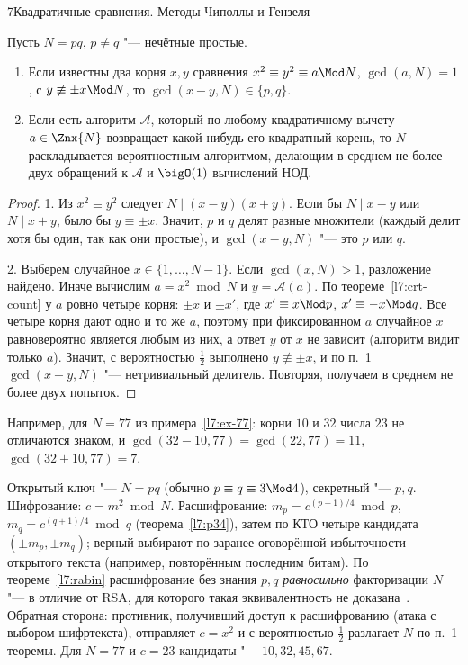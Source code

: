 \begin{lecture}{7}{Квадратичные сравнения. Методы Чиполлы и Гензеля}
\begin{theorem}[Рабин]\label{l7:rabin}
Пусть $N = pq$, $p \ne q$ "--- нечётные простые.
\begin{enumerate}
  \item Если известны два корня $x, y$ сравнения $x^2 \equiv y^2 \equiv a \Mod N$, $\gcd(a, N) = 1$,
    с $y \not\equiv \pm x \Mod N$, то $\gcd(x - y, N) \in \{p, q\}$.
  \item Если есть алгоритм $\mathcal{A}$, который по любому квадратичному вычету
    $a \in \Znx{N}$ возвращает какой-нибудь его квадратный корень, то $N$ раскладывается
    вероятностным алгоритмом, делающим в среднем не более двух обращений к $\mathcal{A}$ и
    $\bigO(1)$ вычислений НОД.
\end{enumerate}
\end{theorem}

\begin{proof}
1. Из $x^2 \equiv y^2$ следует $N \mid (x - y)(x + y)$. Если бы $N \mid x - y$ или $N \mid x + y$,
было бы $y \equiv \pm x$. Значит, $p$ и $q$ делят разные множители (каждый делит хотя бы один, так как они простые), и
$\gcd(x - y, N)$ "--- это $p$ или $q$.

2. Выберем случайное $x \in \{1, \dots, N - 1\}$. Если $\gcd(x, N) > 1$, разложение найдено.
Иначе вычислим $a = x^2 \bmod N$ и $y = \mathcal{A}(a)$. По теореме~\ref{l7:crt-count} у $a$ ровно
четыре корня: $\pm x$ и $\pm x'$, где $x' \equiv x \Mod p$, $x' \equiv -x \Mod q$. Все четыре
корня дают одно и то же $a$, поэтому при фиксированном $a$ случайное $x$ равновероятно
является любым из них, а ответ $y$ от $x$ не зависит (алгоритм видит только $a$). Значит, с
вероятностью $\frac12$ выполнено $y \not\equiv \pm x$, и по п.~1 $\gcd(x - y, N)$ "--- нетривиальный
делитель. Повторяя, получаем в среднем не более двух попыток.
\end{proof}

Например, для $N = 77$ из примера~\ref{l7:ex-77}: корни $10$ и $32$ числа $23$ не отличаются
знаком, и $\gcd(32 - 10, 77) = \gcd(22, 77) = 11$, $\gcd(32 + 10, 77) = 7$.

\begin{remark}
Открытый ключ "--- $N = pq$ (обычно $p \equiv q \equiv 3 \Mod 4$), секретный "--- $p, q$.
Шифрование: $c = m^2 \bmod N$. Расшифрование: $m_p = c^{(p+1)/4} \bmod p$,
$m_q = c^{(q+1)/4} \bmod q$ (теорема~\ref{l7:p34}), затем по КТО четыре кандидата
$(\pm m_p, \pm m_q)$; верный выбирают по заранее оговорённой избыточности открытого текста
(например, повторённым последним битам). По теореме~\ref{l7:rabin} расшифрование без знания $p, q$
\emph{равносильно} факторизации $N$ "--- в отличие от RSA, для которого такая эквивалентность не
доказана~\cite{rabin-signatures}. Обратная сторона: противник, получивший доступ к
расшифрованию (атака с выбором шифртекста), отправляет $c = x^2$ и с вероятностью $\frac12$
разлагает $N$ по п.~1 теоремы. Для $N = 77$ и $c = 23$ кандидаты "--- $10, 32, 45, 67$.
\end{remark}


\end{lecture}

